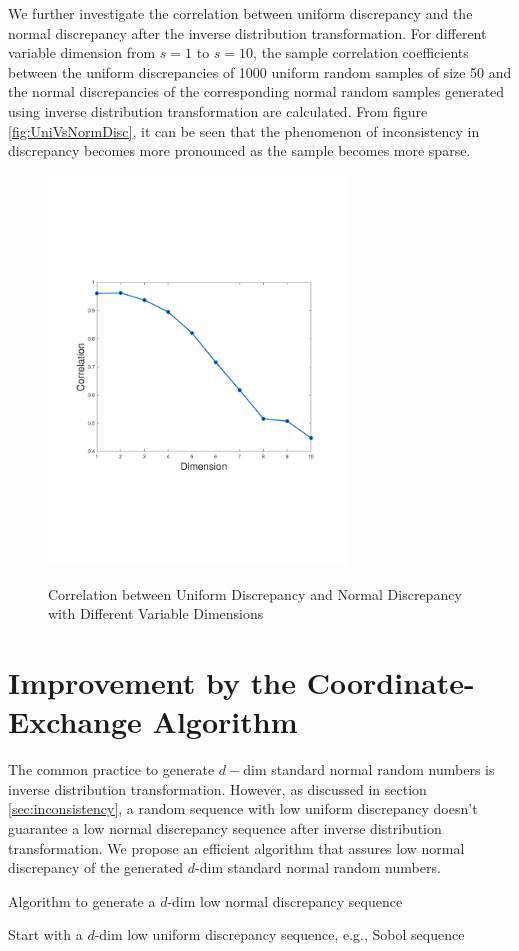 \documentclass[graybox]{svmult}
\begin{document}
We further investigate the correlation between uniform discrepancy and the normal discrepancy after the inverse distribution transformation. For different variable dimension from $s=1$ to $s=10$, the sample correlation coefficients between the uniform discrepancies of 1000 uniform random samples of size 50 and the normal discrepancies of the corresponding normal random samples generated using inverse distribution transformation are calculated. From figure \ref{fig:UniVsNormDisc}, it can be seen that the phenomenon of inconsistency in discrepancy becomes more pronounced as the sample becomes more sparse.

\begin{figure}[htbp]
\label{fig:DimVsDisc}
\centering
{\includegraphics[width=8cm]{dimVsdisc.pdf}}
\caption{Correlation between Uniform Discrepancy and Normal Discrepancy with Different Variable Dimensions}
\end{figure}

\section{Improvement by the Coordinate-Exchange Algorithm}
The common practice to generate $d-$dim standard normal random numbers is inverse distribution transformation. However, as discussed in section \ref{sec:inconsistency}, a random sequence with low uniform discrepancy doesn't guarantee a low normal discrepancy sequence after inverse distribution transformation. We propose an efficient algorithm that assures low normal discrepancy of the generated $d$-dim standard normal random numbers.
\begin{algorithm}[ht]
\begin{algorithmic}[1]
\caption{Algorithm to generate a $d$-dim low normal discrepancy sequence}
\State Start with a $d$-dim low uniform discrepancy sequence, e.g., Sobol sequence 
\State 
\end{algorithmic}
\end{algorithm}
\end{document}
